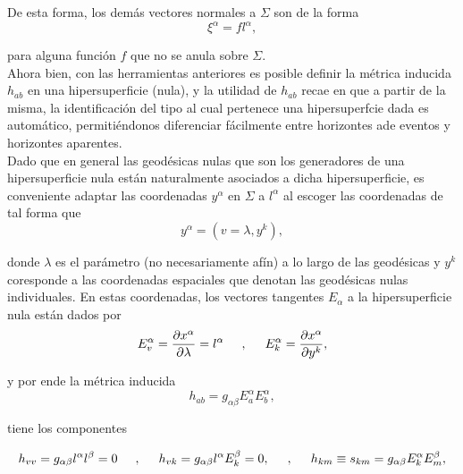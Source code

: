 \documentclass[16pt,a4paper]{article}
\numberwithin{equation}{section}
\theoremstyle{definition}
\begin{document}
De esta forma, los demás vectores normales a $\Sigma$ son de la forma
\begin{equation*}
\xi^\alpha = fl^\alpha,
\end{equation*}

para alguna función $f$ que no se anula sobre $\Sigma$.\\

Ahora bien, con las herramientas anteriores es posible definir la métrica inducida $h_{ab}$ en una hipersuperficie (nula), y la utilidad de $h_{ab}$ recae en que a partir de la misma, la identificación del tipo al cual pertenece una hipersuperfcie dada es automático, permitiéndonos diferenciar fácilmente entre horizontes ade eventos y horizontes aparentes.\\

Dado que en general las geodésicas nulas que son los generadores de una hipersuperficie nula están naturalmente asociados a dicha hipersuperficie, es conveniente adaptar las coordenadas $y^\alpha$ en $\Sigma$ a $l^\alpha$ al escoger las coordenadas de tal forma que 
\begin{equation*}
y^\alpha = (v = \lambda, y^k),
\end{equation*}

donde $\lambda$ es el parámetro (no necesariamente afín) a lo largo de las geodésicas y $y^k$ coresponde a las coordenadas espaciales que denotan las geodésicas nulas individuales. En estas coordenadas, los vectores tangentes $E_\alpha$ a la hipersuperficie nula están dados por
\begin{equation*}
E^{\alpha}_{v} = \frac{\partial x^\alpha}{\partial \lambda} = l^\alpha \hspace{.5cm}, \hspace{.5cm} E^{\alpha}_{k} =\frac{\partial x^\alpha}{\partial y^k},
\end{equation*}

y por ende la métrica inducida
\begin{equation*}
h_{ab} = g_{\alpha \beta} E^{\alpha}_{a} E^{\alpha}_{b},
\end{equation*}

tiene los componentes 

\begin{equation*}
h_{vv} = g_{\alpha \beta} l^\alpha l^\beta = 0 \hspace{.5cm},\hspace{.5cm} h_{vk} = g_{\alpha \beta} l^\alpha E^{\beta}_{k} = 0, \hspace{.5cm},\hspace{.5cm} h_{km} \equiv s_{km} = g_{\alpha \beta} E^{\alpha}_{k} E^{\beta}_{m},
\end{equation*}
\end{document}
